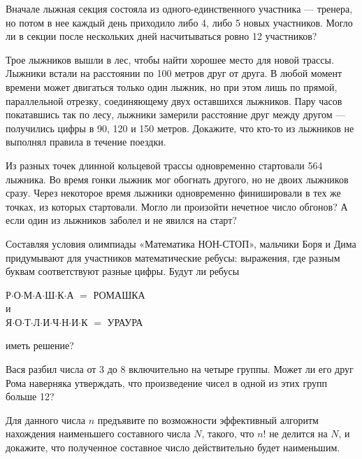 \begin{itemize}
\itA Вначале лыжная секция состояла из одного-единственного участника — тренера, но потом в нее каждый день приходило либо 4, либо 5 новых участников. Могло ли в секции после нескольких дней насчитываться ровно 12 участников?

\itB Трое лыжников вышли в лес, чтобы найти хорошее место для новой трассы. Лыжники встали на расстоянии по 100 метров друг от друга. В любой момент времени может двигаться только один лыжник, но при этом лишь по прямой, параллельной отрезку, соединяющему двух оставшихся лыжников. Пару часов покатавшись так по лесу, лыжники замерили расстояние друг между другом — получились цифры в 90, 120 и 150 метров. Докажите, что кто-то из лыжников не выполнял правила в течение поездки.

\itC Из разных точек длинной кольцевой трассы одновременно стартовали 564 лыжника. Во время гонки лыжник мог обогнать другого, но не двоих лыжников сразу. Через некоторое время лыжники одновременно финишировали в тех же точках, из которых стартовали. Могло ли произойти нечетное число обгонов? А если один из лыжников заболел и не явился на старт?
\end{itemize}

\begin{itemize}
\itA Составляя условия олимпиады «Математика НОН-СТОП», мальчики Боря и Дима придумывают для участников математические ребусы: выражения, где разным буквам соответствуют разные цифры. Будут ли ребусы
\begin{center}
	Р$\cdot$О$\cdot$М$\cdot$А$\cdot$Ш$\cdot$К$\cdot$А $=$ РОМАШКА\\
	и \\
	Я$\cdot$О$\cdot$Т$\cdot$Л$\cdot$И$\cdot$Ч$\cdot$Н$\cdot$И$\cdot$К $=$ УРАУРА
\end{center}
иметь решение?

\itB Вася разбил числа от 3 до 8 включительно на четыре группы. Может ли его друг Рома наверняка утверждать, что произведение чисел в одной из этих групп больше 12?

\itC Для данного числа $n$ предъявите по возможности эффективный алгоритм нахождения 
наименьшего составного числа $N$, такого, 
что $n!$ не делится на $N$, и докажите, что полученное составное число действительно будет 
наименьшим.
\end{itemize}

